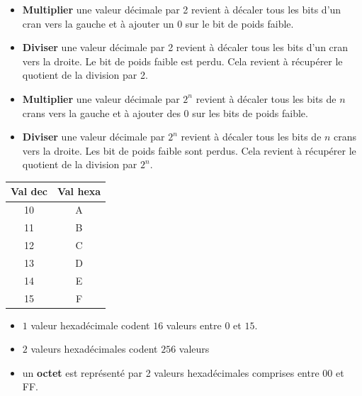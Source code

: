 	

	\begin{propriete}{}
		\begin{itemize}
			\item \textbf{Multiplier} une valeur décimale par 2 revient à décaler tous les bits d'un cran vers la gauche et à ajouter un 0 sur le bit de poids faible.
			\item \textbf{Diviser} une valeur décimale par 2 revient à décaler tous les bits d'un cran vers la droite. Le bit de poids faible est perdu. Cela revient à récupérer le quotient de la division par 2.
			\item \textbf{Multiplier} une valeur décimale par $2^n$ revient à décaler tous les bits de $n$ crans vers la gauche et à ajouter des 0 sur les bits de poids faible.
			\item \textbf{Diviser} une valeur décimale par $2^n$ revient à décaler tous les bits de $n$ crans vers la droite. Les bit de poids faible sont perdus. Cela revient à récupérer le quotient de la division par $2^n$.
		\end{itemize}
	\end{propriete}

\pagebreak
	
	\begin{propriete}{}
\begin{minipage}{0.18\linewidth}
		\begin{tabular}{|c|c|}
	\hline
	Val dec & Val hexa \\ \hline
	10 & A \\ \hline
	11 & B \\ \hline
	12 & C \\ \hline
	13 & D \\ \hline
	14 & E \\ \hline
	15 & F \\ \hline
\end{tabular}
	\end{minipage}\hfill
	\begin{minipage}{0.78\linewidth}
		\begin{itemize}
		\item $1$ valeur hexadécimale codent $16$ valeurs entre 0 et $15$.
		\item $2$ valeurs hexadécimales codent $256$ valeurs
		\item un \textbf{octet} est représenté par 2 valeurs hexadécimales comprises entre 00 et FF.
	\end{itemize}

	\end{minipage}

	\end{propriete}
		
